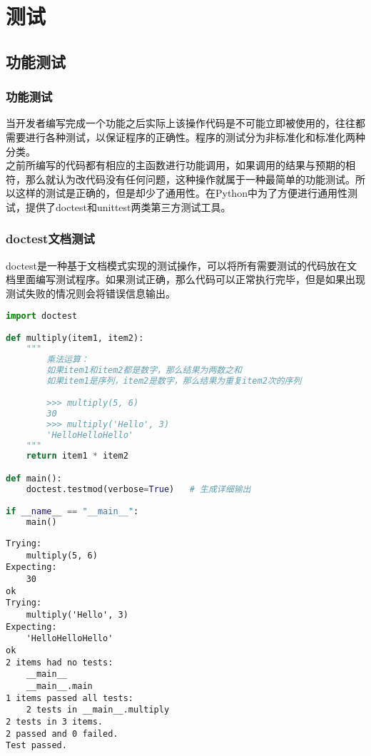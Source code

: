 \chapter{测试}

\section{功能测试}

\subsection{功能测试}

当开发者编写完成一个功能之后实际上该操作代码是不可能立即被使用的，往往都需要进行各种测试，以保证程序的正确性。程序的测试分为非标准化和标准化两种分类。\\

之前所编写的代码都有相应的主函数进行功能调用，如果调用的结果与预期的相符，那么就认为改代码没有任何问题，这种操作就属于一种最简单的功能测试。所以这样的测试是正确的，但是却少了通用性。在Python中为了方便进行通用性测试，提供了doctest和unittest两类第三方测试工具。\\

\subsection{doctest文档测试}

doctest是一种基于文档模式实现的测试操作，可以将所有需要测试的代码放在文档里面编写测试程序。如果测试正确，那么代码可以正常执行完毕，但是如果出现测试失败的情况则会将错误信息输出。\\


\begin{lstlisting}[language=Python]
import doctest

def multiply(item1, item2):
    """
        乘法运算：
        如果item1和item2都是数字，那么结果为两数之和
        如果item1是序列，item2是数字，那么结果为重复item2次的序列

        >>> multiply(5, 6)
        30
        >>> multiply('Hello', 3)
        'HelloHelloHello'
    """
    return item1 * item2

def main():
    doctest.testmod(verbose=True)   # 生成详细输出

if __name__ == "__main__":
    main()
\end{lstlisting}

\begin{tcolorbox}
	\begin{verbatim}
Trying:
    multiply(5, 6)
Expecting:
    30
ok
Trying:
    multiply('Hello', 3)
Expecting:
    'HelloHelloHello'
ok
2 items had no tests:
    __main__
    __main__.main
1 items passed all tests:
    2 tests in __main__.multiply
2 tests in 3 items.
2 passed and 0 failed.
Test passed.
\end{verbatim}
\end{tcolorbox}

